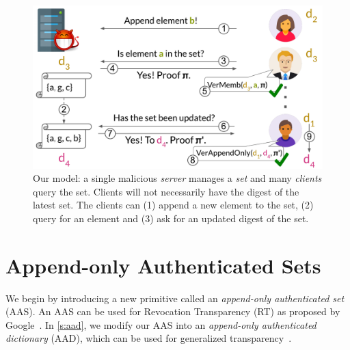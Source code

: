 
\newcommand{\figModel}{
\begin{figure}[t]
    \centering
    \includegraphics[width=1.0\columnwidth]{figures/model.pdf}
    \vspace{-.5cm}
    \caption{
        Our model: a single malicious \textit{server} manages a \textit{set} and many \textit{clients} query the set.
        Clients will not necessarily have the digest of the latest set.
        The clients can (1) append a new element to the set, (2) query for an element and (3) ask for an updated digest of the set.
    }
    \label{f:model}
    \vspace{-1.5em}
\end{figure}
}

\figModel

\section{Append-only Authenticated Sets}
\label{s:aas}

We begin by introducing a new primitive called an \textit{append-only authenticated set} (AAS).
An AAS can be used for Revocation Transparency (RT) as proposed by Google~\cite{rev-transparency}.
In \cref{s:aad}, we modify our AAS into an \textit{append-only authenticated dictionary} (AAD), which can be used for generalized transparency~\cite{general-transparency}.

